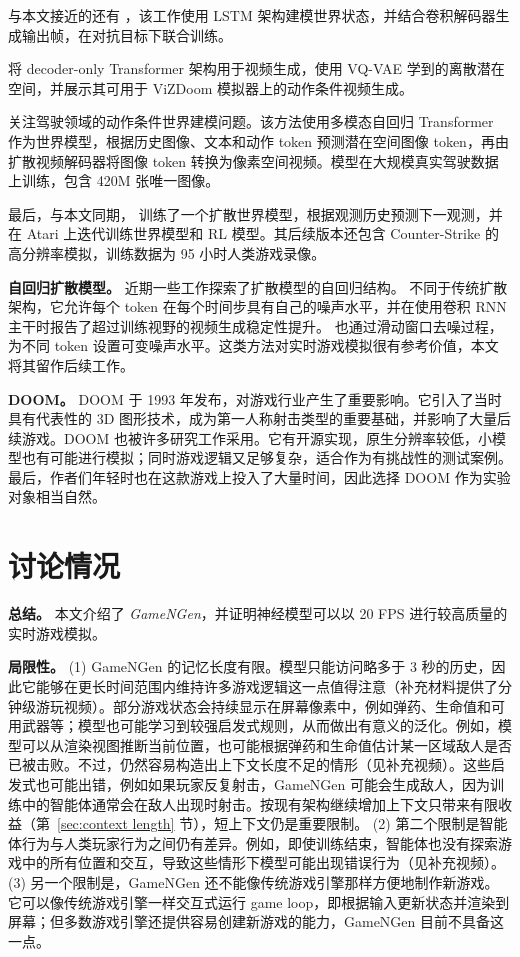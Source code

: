 \documentclass{article} %
\begin{document}
与本文接近的还有 \cite{Kim2020_GameGan}，该工作使用 LSTM 架构建模世界状态，并结合卷积解码器生成输出帧，在对抗目标下联合训练。

\cite{yan2021videogpt} 将 decoder-only Transformer 架构用于视频生成，使用 VQ-VAE 学到的离散潜在空间，并展示其可用于 ViZDoom 模拟器上的动作条件视频生成。

\cite{gaia2023} 关注驾驶领域的动作条件世界建模问题。该方法使用多模态自回归 Transformer 作为世界模型，根据历史图像、文本和动作 token 预测潜在空间图像 token，再由扩散视频解码器将图像 token 转换为像素空间视频。模型在大规模真实驾驶数据上训练，包含 420M 张唯一图像。

最后，与本文同期，\cite{alonso2024diffusion} 训练了一个扩散世界模型，根据观测历史预测下一观测，并在 Atari 上迭代训练世界模型和 RL 模型。其后续版本还包含 Counter-Strike 的高分辨率模拟，训练数据为 95 小时人类游戏录像。

\textbf{自回归扩散模型。} 近期一些工作探索了扩散模型的自回归结构。\cite{chen2024diffusionforcingnexttokenprediction} 不同于传统扩散架构，它允许每个 token 在每个时间步具有自己的噪声水平，并在使用卷积 RNN 主干时报告了超过训练视野的视频生成稳定性提升。\cite{rollingdiffusion2024} 也通过滑动窗口去噪过程，为不同 token 设置可变噪声水平。这类方法对实时游戏模拟很有参考价值，本文将其留作后续工作。

\textbf{DOOM。} DOOM 于 1993 年发布，对游戏行业产生了重要影响。它引入了当时具有代表性的 3D 图形技术，成为第一人称射击类型的重要基础，并影响了大量后续游戏。DOOM 也被许多研究工作采用。它有开源实现，原生分辨率较低，小模型也有可能进行模拟；同时游戏逻辑又足够复杂，适合作为有挑战性的测试案例。最后，作者们年轻时也在这款游戏上投入了大量时间，因此选择 DOOM 作为实验对象相当自然。


\section{讨论情况}
\label{sec:discussion}

\textbf{总结。} 本文介绍了 \emph{GameNGen}，并证明神经模型可以以 20 FPS 进行较高质量的实时游戏模拟。

\textbf{局限性。} (1) GameNGen 的记忆长度有限。模型只能访问略多于 3 秒的历史，因此它能够在更长时间范围内维持许多游戏逻辑这一点值得注意（补充材料提供了分钟级游玩视频）。部分游戏状态会持续显示在屏幕像素中，例如弹药、生命值和可用武器等；模型也可能学习到较强启发式规则，从而做出有意义的泛化。例如，模型可以从渲染视图推断当前位置，也可能根据弹药和生命值估计某一区域敌人是否已被击败。不过，仍然容易构造出上下文长度不足的情形（见补充视频）。这些启发式也可能出错，例如如果玩家反复射击，GameNGen 可能会生成敌人，因为训练中的智能体通常会在敌人出现时射击。按现有架构继续增加上下文只带来有限收益（第~\ref{sec:context length} 节），短上下文仍是重要限制。
(2) 第二个限制是智能体行为与人类玩家行为之间仍有差异。例如，即使训练结束，智能体也没有探索游戏中的所有位置和交互，导致这些情形下模型可能出现错误行为（见补充视频）。
(3) 另一个限制是，GameNGen 还不能像传统游戏引擎那样方便地制作新游戏。它可以像传统游戏引擎一样交互式运行 game loop，即根据输入更新状态并渲染到屏幕；但多数游戏引擎还提供容易创建新游戏的能力，GameNGen 目前不具备这一点。
\end{document}
